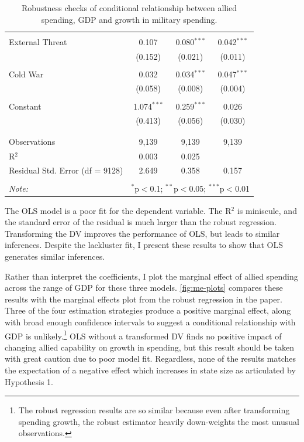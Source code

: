 \documentclass[12pt]{article}
\begin{document}
\begin{table}[!htbp]
\begin{tabular}{@{\extracolsep{5pt}}lccc}
  & & & \\ 
 External Threat & 0.107 & 0.080$^{***}$ & 0.042$^{***}$ \\ 
  & (0.152) & (0.021) & (0.011) \\ 
  & & & \\ 
 Cold War & 0.032 & 0.034$^{***}$ & 0.047$^{***}$ \\ 
  & (0.058) & (0.008) & (0.004) \\ 
  & & & \\ 
 Constant & 1.074$^{***}$ & 0.259$^{***}$ & 0.026 \\ 
  & (0.413) & (0.056) & (0.030) \\ 
  & & & \\ 
\hline \\[-1.8ex] 
Observations & 9,139 & 9,139 & 9,139 \\ 
R$^{2}$ & 0.003 & 0.025 &  \\ 
Residual Std. Error (df = 9128) & 2.649 & 0.358 & 0.157 \\ 
\hline 
\hline \\[-1.8ex] 
\textit{Note:}  & \multicolumn{3}{r}{$^{*}$p$<$0.1; $^{**}$p$<$0.05; $^{***}$p$<$0.01} \\ 
\end{tabular} 
\caption{Robustness checks of conditional relationship between allied spending, GDP and growth in military spending.}
\label{tab:ols-est}
\end{table} 


The OLS model is a poor fit for the dependent variable. 
The R$^2$ is miniscule, and the standard error of the residual is much larger than the robust regression. 
Transforming the DV improves the performance of OLS, but leads to similar inferences. 
Despite the lackluster fit, I present these results to show that OLS generates similar inferences. 


Rather than interpret the coefficients, I plot the marginal effect of allied spending across the range of GDP for these three models.
\autoref{fig:me-plots} compares these results with the marginal effects plot from the robust regression in the paper. 
Three of the four estimation strategies produce a positive marginal effect, along with broad enough confidence intervals to suggest a conditional relationship with GDP is unlikely.\footnote{The robust regression results are so similar because even after transforming spending growth, the robust estimator heavily down-weights the most unusual observations.} 
OLS without a transformed DV finds no positive impact of changing allied capability on growth in spending, but this result should be taken with great caution due to poor model fit. 
Regardless, none of the results matches the expectation of a negative effect which increases in state size as articulated by Hypothesis 1. 
\end{document}
